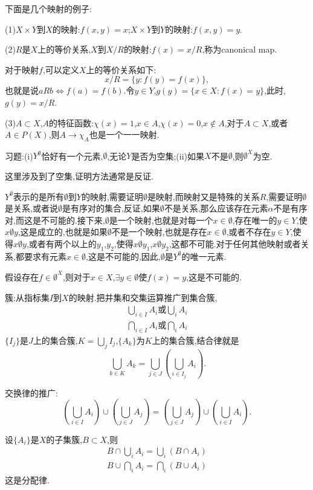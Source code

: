 \documentclass[12pt,a4paper,openany]{book}
\begin{document}
下面是几个映射的例子:

(1)$X \times Y$到$X$的映射:$f(x,y)=x$;$X \times Y$到$Y$的映射:$f(x,y)=y$.

(2)$R$是$X$上的等价关系,$X$到$X/R$的映射:$f(x)=x/R$,称为canonical map.

对于映射$f$,可以定义$X$上的等价关系如下:
\[
x/R=\{y:f(y)=f(x)\},
\]
也就是说$aRb\Leftrightarrow f(a)=f(b)$.令$y \in Y$,$g(y)=\{x \in X:f(x)=y\}$,此时,$g(y)=x/R$.

(3)$A \subset X$,$A$的特征函数:$\chi(x)=1$,$x \in A$,$\chi(x)=0$,$x \notin A$,对于$A \subset X$,或者$A \in P(X)$,则$A \to \chi_A$也是一个一一映射.

习题:(i)$Y^{\emptyset}$恰好有一个元素,$\emptyset$,无论$Y$是否为空集;(ii)如果$X$不是$\emptyset$,则$\emptyset^X$为空.

这里涉及到了空集,证明方法通常是反证.

$Y^{\emptyset}$表示的是所有$\emptyset$到$Y$的映射,需要证明$\emptyset$是映射,而映射又是特殊的关系$R$,需要证明$\emptyset$是关系,或者说$\emptyset$是有序对的集合,反证,如果$\emptyset$不是关系,那么应该存在元素$\alpha$不是有序对,而这是不可能的.接下来,$\emptyset$是一个映射,也就是对每一个$x \in \emptyset$,存在唯一的$y \in Y$,使$x\emptyset{}y$,这是成立的,也就是如果$\emptyset$不是一个映射,也就是存在$x \in \emptyset$,或者不存在$y \in Y$,使得$x \emptyset y$,或者有两个以上的$y_1$,$y_2$,使得$x \emptyset y_1$,$x \emptyset y_2$,这都不可能.对于任何其他映射或者关系,都要求有元素$x \in \emptyset$,这是不可能的,因此,$\emptyset$是$Y^{\emptyset}$的唯一元素.

假设存在$f \in \emptyset^X$,则对于$x \in X$,$\exists y \in \emptyset$使$f(x)=y$,这是不可能的.

簇:从指标集$I$到$X$的映射.把并集和交集运算推广到集合簇,
\begin{gather*}
\bigcup_{i \in I}{A_i} \text{或} \bigcup_{i}{A_i}\\
\bigcap_{i \in I}{A_i} \text{或} \bigcap_{i}{A_i}
\end{gather*}
$\{I_j\}$是$J$上的集合簇,$K=\bigcup_{j}{I_j}$,$\{A_k\}$为$K$上的集合簇,结合律就是
\[
\bigcup_{k \in K}{A_k} = \bigcup_{j \in J}{(\bigcup_{i \in I_j}{A_i})}.
\]

交换律的推广:
\[
(\bigcup_{i \in I}{A_i}) \cup (\bigcup_{j \in J}{A_j}) = (\bigcup_{j \in J}{A_j}) \cup (\bigcup_{i \in I}{A_i}).
\]

设$\{A_i\}$是$X$的子集簇,$B \subset X$,则
\begin{gather*}
B \cap \bigcup_{i}{A_i} = \bigcup_{i}{(B \cap A_i)} \\
B \cup \bigcap_{i}{A_i} = \bigcap_{i}{(B \cup A_i)}
\end{gather*}
这是分配律.
\end{document}
